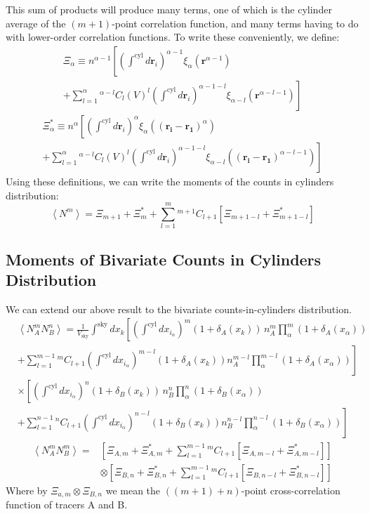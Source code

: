 \documentclass[fleqn,usenatbib]{mnras}
\newcommand*{\Comb}[2]{{}^{#1}C_{#2}}%
\begin{document}
This sum of products will produce many terms, one of which is the cylinder average of the $(m+1)$-point correlation function, and many terms having to do with lower-order correlation functions. To write these conveniently, we define:
\begin{multline}
\Xi_\alpha \equiv n^{\alpha-1}\left[\left(\int^{\text{cyl}}d\mathbf{r}_i\right)^{\alpha-1}\xi_\alpha(\mathbf{r}^{\alpha-1})\right. \\
\left.+\sum_{l=1}^\alpha\Comb{\alpha-l}{l}(V)^l\left(\int^{\text{cyl}}d\mathbf{r}_i\right)^{\alpha-1-l}\xi_{\alpha-l}(\mathbf{r}^{\alpha-l-1})\right]
\end{multline}
\begin{multline}
\Xi^*_\alpha \equiv n^{\alpha}\left[\left(\int^{\text{cyl}}d\mathbf{r}_i\right)^{\alpha}\xi_\alpha(\mathbf{(r_i-r_1)}^{\alpha})\right.\\
+\left.\sum_{l=1}^\alpha\Comb{\alpha-l}{l}(V)^l\left(\int^{\text{cyl}}d\mathbf{r}_i\right)^{\alpha-1-l}\xi_{\alpha-l}(\mathbf{(r_i-r_1)}^{\alpha-l-1})\right]
\end{multline}
Using these definitions, we can write the moments of the counts in cylinders distribution:
\begin{equation}
\left<N^m\right> = \Xi_{m+1} + \Xi^*_{m} + \sum_{l=1}^{m}\Comb{m+1}{l+1}\left[\Xi_{m+1-l}+\Xi^*_{m+1-l}\right]
\end{equation}

\subsection*{Moments of Bivariate Counts in Cylinders Distribution}
We can extend our above result to the bivariate counts-in-cylinders distribution.
\begin{multline}
&\left<N_A^mN_B^n\right> = \frac{1}{V_{\text{sky}}}\int^{\text{sky}}dx_k\left[\left(\int^{\text{cyl}}dx_{i_\alpha}\right)^m  (1+\delta_A(x_k))\,n_A^m\prod_\alpha^m (1+\delta_A(x_\alpha)) \right. \\ &\left.
+ \sum_{l=1}^{m-1}\Comb{m}{l+1} \left(\int^{\text{cyl}}dx_{i_\alpha}\right)^{m-l} (1+\delta_A(x_k))  n_A^{m-l}\prod_\alpha^{m-l} (1+\delta_A(x_\alpha))\right]
\\ & \times\left[\left(\int^{\text{cyl}}dx_{i_\alpha}\right)^n  (1+\delta_B(x_k))\,n_B^n\prod_\alpha^n (1+\delta_B(x_\alpha)) \right. \\ &\left.
+ \sum_{l=1}^{n-1}\Comb{n}{l+1} \left(\int^{\text{cyl}}dx_{i_\alpha}\right)^{n-l} (1+\delta_B(x_k))  n_B^{n-l}\prod_\alpha^{n-l} (1+\delta_B(x_\alpha))\right]
\end{multline}
\begin{multline}
\left<N_A^mN_B^m\right> = & \left[\Xi_{A,m} + \Xi^*_{A,m} + \sum_{l=1}^{m-1}\Comb{m}{l+1}\left[\Xi_{A,m-l}+\Xi^*_{A,m-l}\right]\right] 
\\ & \otimes \left[\Xi_{B,n} + \Xi^*_{B,n} + \sum_{l=1}^{m-1}\Comb{m}{l+1}\left[\Xi_{B,n-l}+\Xi^*_{B,n-l}\right]\right] 
\label{bivariate cic eq}
\end{multline}
Where by $\Xi_{a,m}\otimes\Xi_{B,n}$ we mean the $((m+1) + n)$-point cross-correlation function of tracers A and B.
\end{document}
